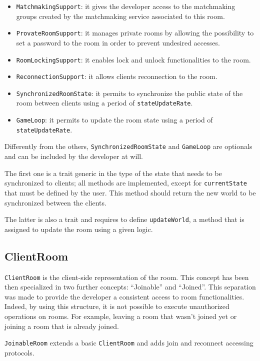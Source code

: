 \begin{itemize}
	\item \texttt{MatchmakingSupport}: it gives the developer access to the matchmaking groups created by the matchmaking service associated to this room.
	\item \texttt{ProvateRoomSupport}: it manages private rooms by allowing the possibility to set a password to the room in order to prevent undesired accesses.
	\item \texttt{RoomLockingSupport}: it enables lock and unlock functionalities to the room. 
	\item \texttt{ReconnectionSupport}: it allows clients reconnection to the room.
	\item \texttt{SynchronizedRoomState}: it permits to synchronize the public state of the room between clients using a period of \texttt{stateUpdateRate}.
	\item \texttt{GameLoop}: it permits to update the room state using a period of \texttt{stateUpdateRate}.
\end{itemize}

Differently from the others, \texttt{SynchronizedRoomState} and \texttt{GameLoop} are optionals and can be included by the developer at will.

The first one is a trait generic in the type of the state that needs to be synchronized to clients; all methods are implemented, except for \texttt{currentState} that must be defined by the user. This method should return the new world to be synchronized between the clients.

The latter is also a trait and requires to define \texttt{updateWorld}, a method that is assigned to update the room using a given logic.

\subsection{ClientRoom}

\texttt{ClientRoom} is the client-side representation of the room.
This concept has been then specialized in two further concepts: ``Joinable'' and ``Joined''.
This separation was made to provide the developer a consistent access to room functionalities. Indeed, by using this structure, it is not possible to execute unauthorized operations on rooms. For example, leaving a room that wasn't joined yet or joining a room that is already joined.

\bigskip
\texttt{JoinableRoom} extends a basic \texttt{ClientRoom} and adds join and reconnect accessing protocols.


